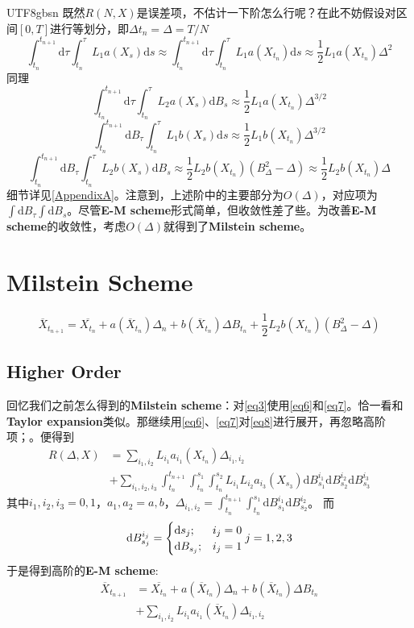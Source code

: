 \documentclass{article}
\begin{document}
\begin{CJK*}{UTF8}{gbsn}
既然$R(N,X)$是误差项，不估计一下阶怎么行呢？在此不妨假设对区间$[0,T]$进行等划分，即$\Delta t_n=\Delta=T/N$
$$
\int_{t_n}^{t_{n+1}}\mathrm{d}\tau\int_{t_n}^\tau L_1a(X_s)\mathrm{d}s\approx
\int_{t_n}^{t_{n+1}}\mathrm{d}\tau\int_{t_n}^\tau L_1a(X_{t_n})\mathrm{d}s\approx
\frac{1}{2}L_1a(X_{t_n})\Delta^2
$$
同理
\begin{equation}
\int_{t_n}^{t_{n+1}}\mathrm{d}\tau\int_{t_n}^\tau L_2a(X_s)\mathrm{d}B_s\approx
\frac{1}{2}L_1a(X_{t_n})\Delta^{3/2}
\label{eq5}\end{equation}
\begin{equation}
\int_{t_n}^{t_{n+1}}\mathrm{d}B_\tau\int_{t_n}^\tau L_1b(X_s)\mathrm{d}s\approx
\frac{1}{2}L_1b(X_{t_n})\Delta^{3/2}
\end{equation}
\begin{equation}
\int_{t_n}^{t_{n+1}}\mathrm{d}B_\tau\int_{t_n}^\tau L_2b(X_s)\mathrm{d}B_s\approx
\frac{1}{2}L_2b(X_{t_n})(B_\Delta^2-\Delta)\approx
\frac{1}{2}L_2b(X_{t_n})\Delta
\end{equation}
细节详见\ref{AppendixA}。注意到，上述阶中的主要部分为$O(\Delta)$，对应项为$\int\mathrm{d}B_\tau\int\mathrm{d}B_s$。尽管\textbf{E-M scheme}形式简单，但收敛性差了些。为改善\textbf{E-M scheme}的收敛性，考虑$O(\Delta)$就得到了\textbf{Milstein scheme}。

\section{Milstein Scheme}
$$
\overline{X}_{t_{n+1}}=\overline{X_{t_n}}+a(\overline{X}_{t_{n}})\Delta_n+b(\overline{X}_{t_{n}})\Delta B_{t_n}+\frac{1}{2}L_2b(X_{t_n})(B_\Delta^2-\Delta)    
$$

\subsection{Higher Order}
回忆我们之前怎么得到的\textbf{Milstein scheme}：对\ref{eq3}使用\ref{eq6}和\ref{eq7}。恰一看和\textbf{Taylor expansion}类似。那继续用\ref{eq6}、\ref{eq7}对\ref{eq8}进行展开，再忽略高阶项；。便得到
$$\begin{aligned}
R(\Delta,X)
&=\sum_{i_1,i_2}L_{i_1}a_{i_1}(X_{t_n})\Delta_{i_1,i_2}\\
&+\sum_{i_1,i_2,i_3}\int_{t_n}^{t_{n+1}}\int_{t_n}^{s_1}\int_{t_n}^{s_2}L_{i_1}L_{i_2}a_{i_3}(X_{s_3})\mathrm{d}B_{s_1}^{i_1}\mathrm{d}B_{s_2}^{i_2}\mathrm{d}B_{s_3}^{i_3}
\end{aligned}$$
其中$i_1,i_2,i_3=0,1$，$a_1,a_2=a,b$，$\Delta_{i_1,i_2}=\int_{t_n}^{t_{n+1}}\int_{t_n}^{s_1}\mathrm{d}B_{s_1}^{i_1}\mathrm{d}B_{s_2}^{i_2}$。
而
$$\mathrm{d}B_{s_j}^{i_j}=\begin{cases}
\mathrm{d}s_j;&i_j=0\\
\mathrm{d}B_{s_j};&i_j=1
\end{cases}
\space j=1,2,3
$$
于是得到高阶的\textbf{E-M scheme}:
$$
\begin{aligned}
    \overline{X}_{t_{n+1}}
    &=\overline{X_{t_n}}+a(\overline{X}_{t_{n}})\Delta_n+b(\overline{X}_{t_{n}})\Delta B_{t_n}\\
    &+\sum_{i_1,i_2}L_{i_1}a_{i_1}(\overline{X}_{t_n})\Delta_{i_1,i_2}
\end{aligned}
$$

\end{CJK*}
\end{document}
